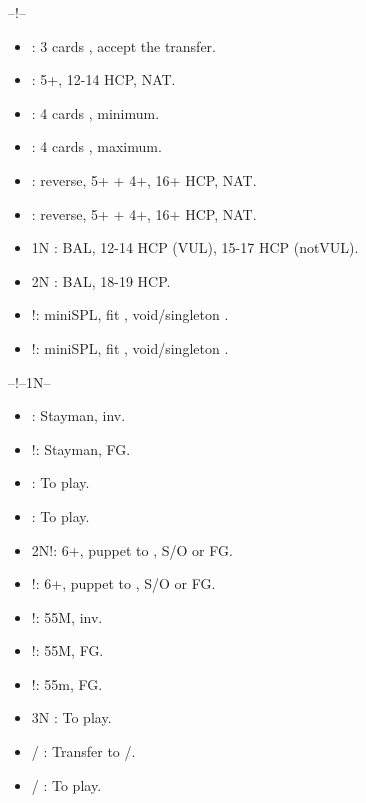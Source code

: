 \documentclass[12pt,twoside,a5paper]{report}%
\begin{document}

	--!--
	\begin{itemize}
	\renewcommand{\labelitemi}{}
	\item {} : 3 cards \sp{}, accept the transfer.
	\item {} : 5+\cl{}, 12-14 HCP, NAT.
	\item {} : 4 cards \sp{}, minimum.
	\item {} : 4 cards \sp{}, maximum.
	\item {} :  reverse, 5+\cl{} + 4+\di{}, 16+ HCP, NAT.
	\item {} :  reverse, 5+\cl{} + 4+\he{}, 16+ HCP, NAT.
	\item 1N : BAL, 12-14 HCP (VUL), 15-17 HCP (notVUL).
	\item 2N : BAL, 18-19 HCP.	
	\item {}!: miniSPL, fit \sp{}, void/singleton \di{}.
	\item {}!: miniSPL, fit \sp{}, void/singleton \he{}.
	\end{itemize}

	--!--1N--%
	\begin{itemize}
	\renewcommand{\labelitemi}{}
	\item {} : Stayman, inv.
	\item {}!: Stayman, FG.
	\item {} : To play.
	\item {} : To play.
	\item 2N!: 6+\cl{}, puppet to , S/O or FG.
	\item {}!: 6+\di{}, puppet to , S/O or FG.
	\item {}!: 55M, inv.
	\item {}!: 55M, FG.
	\item {}!: 55m, FG.
	\item 3N : To play.
	\item {}/ : Transfer to /\sp{}.
	\item {}/ : To play.
	\end{itemize}
\end{document}
